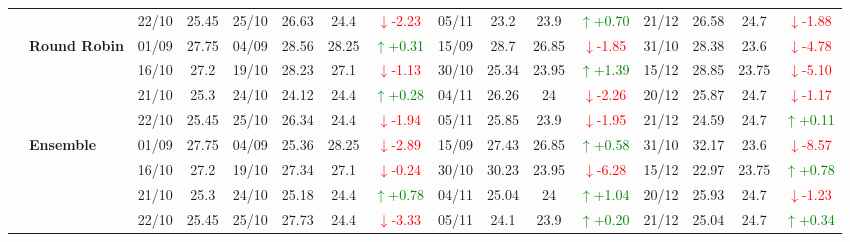 {\begin{longtable}{llcc|cccc|cccc|cccc}
&
& 22/10 & 25.45 & 25/10 & 26.63 & 24.4 & \textcolor{red}{\(\downarrow\)-2.23} & 05/11 & 23.2 & 23.9 & \textcolor{green}{\(\uparrow\)+0.70} & 21/12 & 26.58 & 24.7 & \textcolor{red}{\(\downarrow\)-1.88} \\
\cmidrule(lr){2-16}


& \textbf{Round Robin}
& 01/09 & 27.75 & 04/09 & 28.56 & 28.25 & \textcolor{green}{\(\uparrow\)+0.31} & 15/09 & 28.7 & 26.85 & \textcolor{red}{\(\downarrow\)-1.85} & 31/10 & 28.38 & 23.6 & \textcolor{red}{\(\downarrow\)-4.78} \\

&
& 16/10 & 27.2 & 19/10 & 28.23 & 27.1 & \textcolor{red}{\(\downarrow\)-1.13} & 30/10 & 25.34 & 23.95 & \textcolor{green}{\(\uparrow\)+1.39} & 15/12 & 28.85 & 23.75 & \textcolor{red}{\(\downarrow\)-5.10} \\

&
& 21/10 & 25.3 & 24/10 & 24.12 & 24.4 & \textcolor{green}{\(\uparrow\)+0.28} & 04/11 & 26.26 & 24 & \textcolor{red}{\(\downarrow\)-2.26} & 20/12 & 25.87 & 24.7 & \textcolor{red}{\(\downarrow\)-1.17} \\

&
& 22/10 & 25.45 & 25/10 & 26.34 & 24.4 & \textcolor{red}{\(\downarrow\)-1.94} & 05/11 & 25.85 & 23.9 & \textcolor{red}{\(\downarrow\)-1.95} & 21/12 & 24.59 & 24.7 & \textcolor{green}{\(\uparrow\)+0.11} \\
\cmidrule(lr){2-16}



& \textbf{Ensemble}
& 01/09 & 27.75 & 04/09 & 25.36 & 28.25 & \textcolor{red}{\(\downarrow\)-2.89} & 15/09 & 27.43 & 26.85 & \textcolor{green}{\(\uparrow\)+0.58} & 31/10 & 32.17 & 23.6 & \textcolor{red}{\(\downarrow\)-8.57} \\

&
& 16/10 & 27.2 & 19/10 & 27.34 & 27.1 & \textcolor{red}{\(\downarrow\)-0.24} & 30/10 & 30.23 & 23.95 & \textcolor{red}{\(\downarrow\)-6.28} & 15/12 & 22.97 & 23.75 & \textcolor{green}{\(\uparrow\)+0.78} \\

&
& 21/10 & 25.3 & 24/10 & 25.18 & 24.4 & \textcolor{green}{\(\uparrow\)+0.78} & 04/11 & 25.04 & 24 & \textcolor{green}{\(\uparrow\)+1.04} & 20/12 & 25.93 & 24.7 & \textcolor{red}{\(\downarrow\)-1.23} \\

&
& 22/10 & 25.45 & 25/10 & 27.73 & 24.4 & \textcolor{red}{\(\downarrow\)-3.33} & 05/11 & 24.1 & 23.9 & \textcolor{green}{\(\uparrow\)+0.20} & 21/12 & 25.04 & 24.7 & \textcolor{green}{\(\uparrow\)+0.34} \\


\bottomrule
\end{longtable}
}